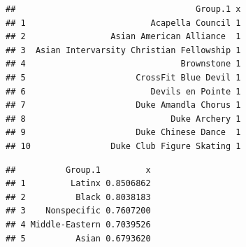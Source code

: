 \documentclass[]{article}
\newenvironment{Shaded}{\begin{snugshade}}{\end{snugshade}}
\newcommand{\DecValTok}[1]{\textcolor[rgb]{0.00,0.00,0.81}{#1}}
\newcommand{\KeywordTok}[1]{\textcolor[rgb]{0.13,0.29,0.53}{\textbf{#1}}}
\newcommand{\NormalTok}[1]{#1}
\newcommand{\OperatorTok}[1]{\textcolor[rgb]{0.81,0.36,0.00}{\textbf{#1}}}
\newcommand{\StringTok}[1]{\textcolor[rgb]{0.31,0.60,0.02}{#1}}
\begin{document}
\begin{Shaded}
\end{Shaded}

\begin{verbatim}
##                                    Group.1 x
## 1                         Acapella Council 1
## 2                 Asian American Alliance  1
## 3  Asian Intervarsity Christian Fellowship 1
## 4                               Brownstone 1
## 5                      CrossFit Blue Devil 1
## 6                         Devils en Pointe 1
## 7                      Duke Amandla Chorus 1
## 8                             Duke Archery 1
## 9                      Duke Chinese Dance  1
## 10                Duke Club Figure Skating 1
\end{verbatim}

\begin{Shaded}
\end{Shaded}

\begin{verbatim}
##          Group.1         x
## 1         Latinx 0.8506862
## 2          Black 0.8038183
## 3    Nonspecific 0.7607200
## 4 Middle-Eastern 0.7039526
## 5          Asian 0.6793620
\end{verbatim}

\begin{Shaded}
\end{Shaded}
\end{document}
